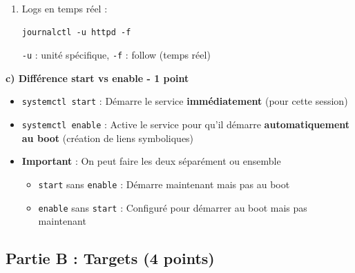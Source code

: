 \documentclass[12pt,a4paper]{article}
\begin{document}
\begin{answerbox}
\begin{enumerate}
    \item Logs en temps réel :
    \begin{lstlisting}
journalctl -u httpd -f
    \end{lstlisting}
    \texttt{-u} : unité spécifique, \texttt{-f} : follow (temps réel)
\end{enumerate}

\textbf{c) Différence start vs enable - 1 point}

\begin{itemize}
    \item \texttt{systemctl start} : Démarre le service \textbf{immédiatement} (pour cette session)
    \item \texttt{systemctl enable} : Active le service pour qu'il démarre \textbf{automatiquement au boot} (création de liens symboliques)
    \item \textbf{Important} : On peut faire les deux séparément ou ensemble
    \begin{itemize}
        \item \texttt{start} sans \texttt{enable} : Démarre maintenant mais pas au boot
        \item \texttt{enable} sans \texttt{start} : Configuré pour démarrer au boot mais pas maintenant
    \end{itemize}
\end{itemize}
\end{answerbox}

\subsection*{Partie B : Targets (4 points)}
\end{document}
